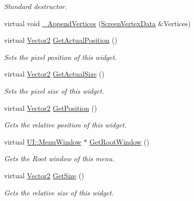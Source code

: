 \begin{DoxyCompactItemize}
\begin{DoxyCompactList}\small\item\em Standard destructor. \item\end{DoxyCompactList}\item 
virtual void \hyperlink{classMezzanine_1_1UI_1_1Menu_a2ca593a768f250398f92a7f8bfc5394c}{\_\-AppendVertices} (\hyperlink{classMezzanine_1_1UI_1_1ScreenVertexData}{ScreenVertexData} \&Vertices)
\item 
virtual \hyperlink{classMezzanine_1_1Vector2}{Vector2} \hyperlink{classMezzanine_1_1UI_1_1Menu_a514ab3a4afb50cd799fe7fde9f877c3d}{GetActualPosition} ()
\begin{DoxyCompactList}\small\item\em Sets the pixel position of this widget. \item\end{DoxyCompactList}\item 
virtual \hyperlink{classMezzanine_1_1Vector2}{Vector2} \hyperlink{classMezzanine_1_1UI_1_1Menu_a301e1b2290e4bc170f527c5dd0179884}{GetActualSize} ()
\begin{DoxyCompactList}\small\item\em Sets the pixel size of this widget. \item\end{DoxyCompactList}\item 
virtual \hyperlink{classMezzanine_1_1Vector2}{Vector2} \hyperlink{classMezzanine_1_1UI_1_1Menu_ac039c785132b468e3aeb5327e656306b}{GetPosition} ()
\begin{DoxyCompactList}\small\item\em Gets the relative position of this widget. \item\end{DoxyCompactList}\item 
virtual \hyperlink{classMezzanine_1_1UI_1_1MenuWindow}{UI::MenuWindow} $\ast$ \hyperlink{classMezzanine_1_1UI_1_1Menu_acab8021587a7af5911b3ed9b44189341}{GetRootWindow} ()
\begin{DoxyCompactList}\small\item\em Gets the Root window of this menu. \item\end{DoxyCompactList}\item 
virtual \hyperlink{classMezzanine_1_1Vector2}{Vector2} \hyperlink{classMezzanine_1_1UI_1_1Menu_a50298380a41d2e8801dffdb9750cb212}{GetSize} ()
\begin{DoxyCompactList}\small\item\em Gets the relative size of this widget. \item\end{DoxyCompactList}\item 

\end{DoxyCompactItemize}
